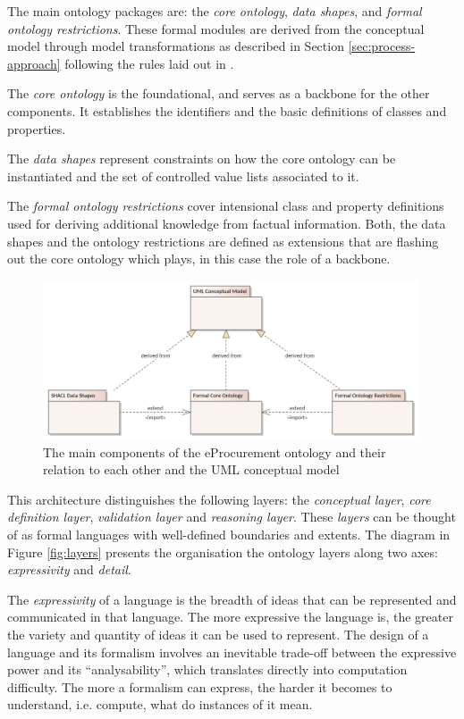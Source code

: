 	The main ontology packages are: the \textit{core ontology}, \textit{data shapes}, and \textit{formal ontology restrictions}. These formal modules are derived from the conceptual model through model transformations as described in Section \ref{sec:process-approach} following the rules laid out in \citep{costetchi2020c}.
	
	The \textit{core ontology} is the foundational, and serves as a backbone for the other components. It establishes the identifiers and the basic definitions of classes and properties.
	 	
	The \textit{data shapes} represent constraints on how the core ontology can be instantiated and the set of controlled value lists associated to it. 	
	
	The \textit{formal ontology restrictions} cover intensional class and property definitions used for deriving additional knowledge from factual information. Both, the data shapes and the ontology restrictions are defined as extensions that are flashing out the core ontology which plays, in this case the role of a backbone.
	
	\begin{figure}[!ht]
		\centering
		\includegraphics[width=0.99\textwidth]{../img/uml.png}
		\caption{The main components of the eProcurement ontology and their relation to each other and the UML conceptual model}
		\label{fig:components}
	\end{figure}
	
	This architecture distinguishes the following layers: the \textit{conceptual layer}, \textit{core definition layer}, \textit{validation layer} and \textit{reasoning layer}. These \textit{layers} can be thought of as formal languages with well-defined boundaries and extents. The diagram in Figure \ref{fig:layers} presents the organisation the ontology layers along two axes: \textit{expressivity} and \textit{detail}. 
	
	The \textit{expressivity} of a language is the breadth of ideas that can be represented and communicated in that language. The more expressive the language is, the greater the variety and quantity of ideas it can be used to represent. The design of a language and its formalism involves an inevitable trade-off between the expressive power and its ``analysability'', which translates directly into computation difficulty. The more a formalism can express, the harder it becomes to understand, i.e. compute, what do instances of it mean.
	
